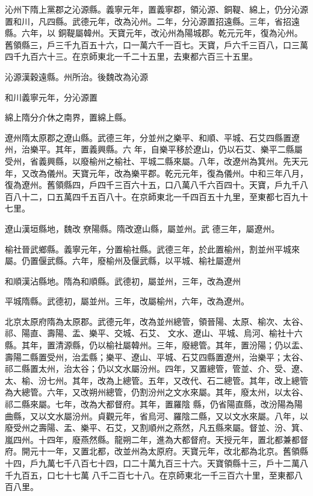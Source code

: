 \begin{pinyinscope}
 沁州下隋上黨郡之沁源縣。義寧元年，置義寧郡，領沁源、銅鞮、綿上，仍分沁源置和川，凡四縣。武德元年，改為沁州。二年，分沁源置招遠縣。三年，省招遠縣。六年，以
 銅鞮屬韓州。天寶元年，改沁州為陽城郡。乾元元年，復為沁州。舊領縣三，戶三千九百五十六，口一萬六千一百七。天寶，戶六千三百八，口三萬四千九百六十三。在京師東北一千二十五里，去東都六百三十五里。



 沁源漢穀遠縣。州所治。後魏改為沁源



 和川義寧元年，分沁源置



 綿上隋分介休之南界，置綿上縣。



 遼州隋太原郡之遼山縣。武德三年，分並州之樂平、和順、平城、石艾四縣置遼州，治樂平。其年，置義興縣。六
 年，自樂平移於遼山，仍以石艾、樂平二縣屬受州，省義興縣，以廢榆州之榆社、平城二縣來屬。八年，改遼州為箕州。先天元年，又改為儀州。天寶元年，改為樂平郡。乾元元年，復為儀州。中和三年八月，復為遼州。舊領縣四，戶四千三百六十五，口八萬八千六百四十。天寶，戶九千八百八十二，口五萬四千五百八十。在京師東北一千四百五十九里，至東都七百九十七里。



 遼山漢垣縣地，魏改尞陽縣。隋改遼山縣，屬並州。武
 德三年，屬遼州。



 榆社晉武鄉縣。義寧元年，分置榆社縣。武德三年，於此置榆州，割並州平城來屬。仍置偃武縣。六年，廢榆州及偃武縣，以平城、榆社屬遼州



 和順漢沾縣地。隋為和順縣。武德初，屬並州，三年，改為遼州



 平城隋縣。武德初，屬並州。三年，改屬榆州，六年，改為遼州。



 北京太原府隋為太原郡。武德元年，改為並州總管，領晉陽、太原、榆次、太谷、祁、陽直、壽陽、盂、樂平、交城、石艾、
 文水、遼山、平城、烏河、榆社十六縣。其年，置清源縣，仍以榆社屬韓州。三年，廢總管。其年，置汾陽；仍以盂、壽陽二縣置受州，治盂縣；樂平、遼山、平城、石艾四縣置遼州，治樂平；太谷、祁二縣置太州，治太谷；仍以文水屬汾州。四年，又置總管，管並、介、受、遼、太、榆、汾七州。其年，改為上總管。五年，又改代、石二總管。其年，改上總管為大總管。六年，又改朔州總管，仍割汾州之文水來屬。其年，廢太州，以太谷、祁二縣來屬。七年，改為大都督府。其年，置羅陰
 縣，仍省陽直縣，改汾陽為陽曲縣，又以文水屬汾州。貞觀元年，省烏河、羅陰二縣，又以文水來屬。八年，以廢受州之壽陽、盂、樂平、石艾，又割順州之燕然，凡五縣來屬。督並、汾、箕、嵐四州。十四年，廢燕然縣。龍朔二年，進為大都督府。天授元年，置北都兼都督府。開元十一年，又置北都，改並州為太原府。天寶元年，改北都為北京。舊領縣十四，戶九萬七千八百七十四，口二十萬九百三十六。天寶領縣十三，戶十二萬八千九百五，口七十七萬
 八千二百七十八。在京師東北一千三百六十里，至東都八百八里。




\end{pinyinscope}
